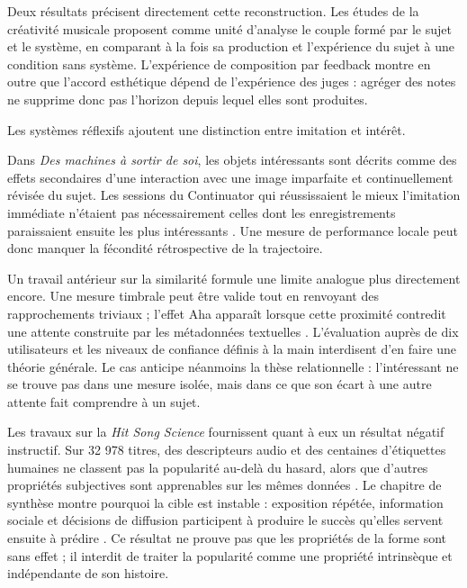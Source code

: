 \documentclass[11pt,a4paper]{article}
\begin{document}
Deux résultats précisent directement cette reconstruction. Les études de la
créativité musicale proposent comme unité d'analyse le couple formé par le sujet
et le système, en comparant à la fois sa production et l'expérience du sujet à
une condition sans système. L'expérience de composition par feedback montre en
outre que l'accord esthétique dépend de l'expérience des juges : agréger des
notes ne supprime donc pas l'horizon depuis lequel elles sont produites.

Les systèmes réflexifs ajoutent une distinction entre imitation et intérêt.

Dans \emph{Des machines à sortir de soi}, les objets intéressants sont décrits comme
des effets secondaires d'une interaction avec une image imparfaite et
continuellement révisée du sujet. Les sessions du Continuator qui réussissaient
le mieux l'imitation immédiate n'étaient pas nécessairement celles dont les
enregistrements paraissaient ensuite les plus intéressants
\parencite{pachet2008machines}. Une mesure de performance locale peut donc
manquer la fécondité rétrospective de la trajectoire.

Un travail antérieur sur la similarité formule une limite analogue plus
directement encore. Une mesure timbrale peut être valide tout en renvoyant des
rapprochements triviaux ; l'effet Aha apparaît lorsque cette proximité contredit
une attente construite par les métadonnées textuelles
\parencite{aucouturier2002similarity}. L'évaluation auprès de dix utilisateurs et
les niveaux de confiance définis à la main interdisent d'en faire une théorie
générale. Le cas anticipe néanmoins la thèse relationnelle : l'intéressant ne se
trouve pas dans une mesure isolée, mais dans ce que son écart à une autre attente
fait comprendre à un sujet.

Les travaux sur la \emph{Hit Song Science} fournissent quant à eux un résultat
négatif instructif. Sur 32 978 titres, des descripteurs audio et des centaines
d'étiquettes humaines ne classent pas la popularité au-delà du hasard, alors que
d'autres propriétés subjectives sont apprenables sur les mêmes données
\parencite{pachetroy2008hitsong}. Le chapitre de synthèse montre pourquoi la cible
est instable : exposition répétée, information sociale et décisions de diffusion
participent à produire le succès qu'elles servent ensuite à prédire
\parencite{pachet2011hitsong}. Ce résultat ne prouve pas que les propriétés de la
forme sont sans effet ; il interdit de traiter la popularité comme une propriété
intrinsèque et indépendante de son histoire.
\end{document}
